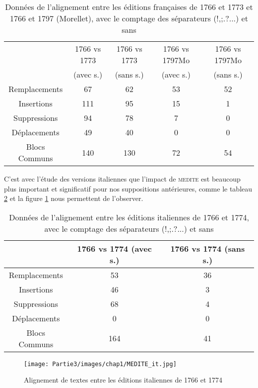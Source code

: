 \begin{table}[H]
\centering
\begin{tabular}{|c|c|c|c|c|}
\hline
 & 1766 vs 1773 & 1766 vs 1773 & 1766 vs 1797Mo & 1766 vs 1797Mo \\
 & (avec s.) & (sans s.) & (avec s.) & (sans s.) \\ \hline
Remplacements & 67 & 62 & 53 & 52 \\ \hline
Insertions & 111 & 95 & 15 & 1 \\ \hline
Suppressions & 94 & 78 & 7 & 0 \\ \hline
Déplacements & 49 & 40 & 0 & 0 \\ \hline
Blocs Communs & 140 & 130 & 72 & 54 \\ \hline
\end{tabular}
\caption{Données de l'alignement entre les éditions françaises de 1766 et 1773 et 1766 et 1797 (Morellet), avec le comptage des séparateurs (!,;.?...) et sans}
\label{table:alignement_medite_fr}
\end{table}

C'est avec l'étude des versions italiennes que l'impact de \textsc{medite} est beaucoup plus important et significatif pour nos suppositions antérieures, comme le tableau \ref{table:alignement_medite_it} et la figure \ref{fig:medite_it} nous permettent de l'observer.
\begin{table}[H]
\centering
\begin{tabular}{|c|c|c|}
\hline
 & 1766 vs 1774 (avec s.) & 1766 vs 1774 (sans s.) \\ \hline
Remplacements & 53 & 36 \\ \hline
Insertions & 46 & 3 \\ \hline
Suppressions & 68 & 4 \\ \hline
Déplacements & 0 & 0 \\ \hline
Blocs Communs & 164 & 41 \\ \hline
\end{tabular}
\caption{Données de l'alignement entre les éditions italiennes de 1766 et 1774, avec le comptage des séparateurs (!,;.?...) et sans}
\label{table:alignement_medite_it}
\end{table}

\begin{figure}[H]
    \centering
    \texttt{[image: Partie3/images/chap1/MEDITE\_it.jpg]}
    \caption{Alignement de textes entre les éditions italiennes de 1766 et 1774}
    \label{fig:medite_it}
\end{figure}

